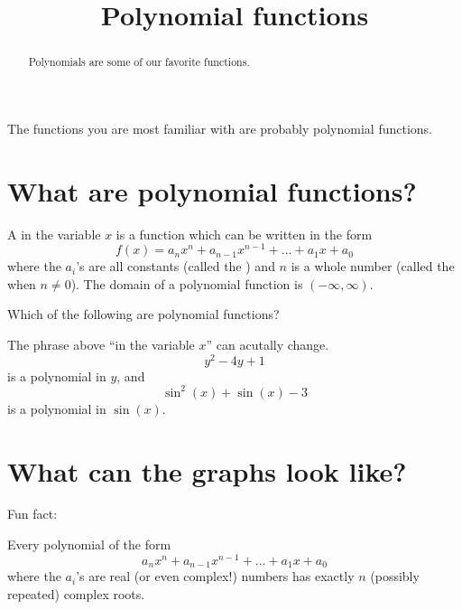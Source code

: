 \documentclass{ximera}
\title[Dig-In:]{Polynomial functions}
\begin{document}
\begin{abstract}
  Polynomials are some of our favorite functions. 
\end{abstract}
\maketitle


The functions you are most familiar with are probably polynomial
functions.

\section{What are polynomial functions?}

\begin{definition}
  A  in the variable $x$ is a function
  which can be written in the form
  \[
  f(x) = a_nx^n + a_{n-1}x^{n-1} + \dots + a_1 x + a_0
  \]
  where the $a_i$'s are all constants (called the )
  and $n$ is a whole number (called the  when $n\ne
  0$). The domain of a polynomial function is $(-\infty,\infty)$.
\end{definition}

\begin{question}
  Which of the following are polynomial functions?
  \begin{multipleChoice}
  \end{multipleChoice}
\end{question}

The phrase above ``in the variable $x$'' can acutally change.
\[
y^2-4y +1
\]
is a polynomial in $y$, and
\[
\sin^2(x) + \sin(x) -3 
\]
is a polynomial in $\sin(x)$.


\section{What can the graphs look like?}

Fun fact:

\begin{theorem}
  Every polynomial of the form
  \[
  a_n x^n + a_{n-1} x^{n-1} + \dots + a_1 x + a_0
  \]
  where the $a_i$'s are real (or even complex!) numbers has exactly
  $n$ (possibly repeated) complex roots.
\end{theorem}
\end{document}
